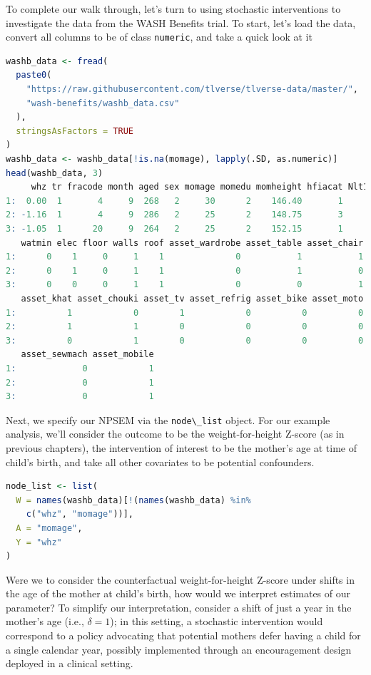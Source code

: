 \documentclass[12pt, krantz2,]{krantz}
\newcommand{\passthrough}[1]{#1}
\theoremstyle{definition}
\theoremstyle{definition}
\theoremstyle{definition}
\newcommand{\1}{\mathbbm{1}}
\begin{document}
To complete our walk through, let's turn to using stochastic interventions to
investigate the data from the WASH Benefits trial. To start, let's load the
data, convert all columns to be of class \passthrough{\lstinline!numeric!}, and take a quick look at it

\begin{lstlisting}[language=R]
washb_data <- fread(
  paste0(
    "https://raw.githubusercontent.com/tlverse/tlverse-data/master/",
    "wash-benefits/washb_data.csv"
  ),
  stringsAsFactors = TRUE
)
washb_data <- washb_data[!is.na(momage), lapply(.SD, as.numeric)]
head(washb_data, 3)
     whz tr fracode month aged sex momage momedu momheight hfiacat Nlt18 Ncomp
1:  0.00  1       4     9  268   2     30      2    146.40       1     3    11
2: -1.16  1       4     9  286   2     25      2    148.75       3     2     4
3: -1.05  1      20     9  264   2     25      2    152.15       1     1    10
   watmin elec floor walls roof asset_wardrobe asset_table asset_chair
1:      0    1     0     1    1              0           1           1
2:      0    1     0     1    1              0           1           0
3:      0    0     0     1    1              0           0           1
   asset_khat asset_chouki asset_tv asset_refrig asset_bike asset_moto
1:          1            0        1            0          0          0
2:          1            1        0            0          0          0
3:          0            1        0            0          0          0
   asset_sewmach asset_mobile
1:             0            1
2:             0            1
3:             0            1
\end{lstlisting}

Next, we specify our NPSEM via the \passthrough{\lstinline!node\_list!} object. For our example analysis,
we'll consider the outcome to be the weight-for-height Z-score (as in previous
chapters), the intervention of interest to be the mother's age at time of
child's birth, and take all other covariates to be potential confounders.

\begin{lstlisting}[language=R]
node_list <- list(
  W = names(washb_data)[!(names(washb_data) %in%
    c("whz", "momage"))],
  A = "momage",
  Y = "whz"
)
\end{lstlisting}

Were we to consider the counterfactual weight-for-height Z-score under shifts in
the age of the mother at child's birth, how would we interpret estimates of our
parameter? To simplify our interpretation, consider a shift of just a year in
the mother's age (i.e., \(\delta = 1\)); in this setting, a stochastic
intervention would correspond to a policy advocating that potential mothers
defer having a child for a single calendar year, possibly implemented through an
encouragement design deployed in a clinical setting.
\end{document}
